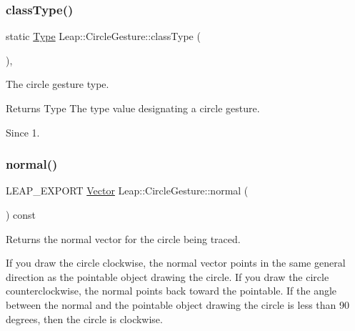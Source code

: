\subsubsection{\texorpdfstring{class\+Type()}{classType()}}
{\footnotesize\ttfamily static \hyperlink{class_leap_1_1_gesture_a6fa6dd4f28c502f0d55abc6b71c6f9b1}{Type} Leap\+::\+Circle\+Gesture\+::class\+Type (\begin{DoxyParamCaption}{ }\end{DoxyParamCaption})\hspace{0.3cm}{\ttfamily [inline]}, {\ttfamily [static]}}

The circle gesture type.


\begin{DoxyCodeInclude}
\end{DoxyCodeInclude}


\begin{DoxyReturn}{Returns}
Type The type value designating a circle gesture. 
\end{DoxyReturn}
\begin{DoxySince}{Since}
1. 
\end{DoxySince}
\mbox{\label{class_leap_1_1_circle_gesture_a8aea3fdef557853fbe443d04919b56ee}} 
\subsubsection{\texorpdfstring{normal()}{normal()}}
{\footnotesize\ttfamily L\+E\+A\+P\+\_\+\+E\+X\+P\+O\+RT \hyperlink{struct_leap_1_1_vector}{Vector} Leap\+::\+Circle\+Gesture\+::normal (\begin{DoxyParamCaption}{ }\end{DoxyParamCaption}) const}

Returns the normal vector for the circle being traced.

If you draw the circle clockwise, the normal vector points in the same general direction as the pointable object drawing the circle. If you draw the circle counterclockwise, the normal points back toward the pointable. If the angle between the normal and the pointable object drawing the circle is less than 90 degrees, then the circle is clockwise.


\begin{DoxyCodeInclude}
\end{DoxyCodeInclude}


